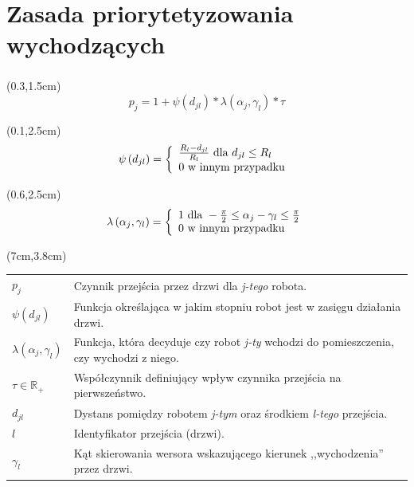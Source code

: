 \documentclass{beamer}
\begin{document}
\section{Zasada priorytetyzowania wychodzących}
\begin{frame}
\frametitle{\secname}

\begin{textblock*}{5cm}(0.3\linewidth,1.5cm) %
	\begin{equation*}
	p_j = 1 + \psi\left(d_{jl}\right) * \lambda\left(\alpha_j,\gamma_l\right) * \tau 
	\end{equation*}
\end{textblock*}

\begin{textblock*}{5cm}(0.1\linewidth,2.5cm) %
	\footnotesize{
		\begin{equation*}
		\psi\left(d_{jl}\right) = \left\{\begin{array}{ll}
		\frac{R_{l} - d_{jl}}{R_{l}} \mbox{ dla } d_{jl} \le R_{l} \\
		0 \mbox{ w innym przypadku }        
		\cr
		\end{array}\right.
		\end{equation*}
	}
\end{textblock*}

\begin{textblock*}{5cm}(0.6\linewidth,2.5cm) %
	\footnotesize{
		\begin{equation*}
		\lambda\left(\alpha_j,\gamma_l\right) = \left\{\begin{array}{ll}
		1  \mbox{ dla } - \frac{\pi}{2} \leq \alpha_j - \gamma_l \leq \frac{\pi}{2} \\
		0  \mbox{ w innym przypadku }
		\cr
		\end{array}\right.
		\end{equation*}	
	}
\end{textblock*}

\begin{textblock*}{4.8cm}(7cm,3.8cm) %
	\scriptsize{
		\begin{tabular}{lp{}}
			$ p_j $ 						& Czynnik przejścia przez drzwi dla  \textit{j-tego} robota.\\
			$ \psi\left(d_{jl}\right) $ 	& Funkcja określająca w jakim stopniu robot jest w zasięgu działania drzwi.\\
			$ \lambda(\alpha_j,\gamma_l) $ 	& Funkcja, która decyduje czy robot \textit{j-ty} wchodzi do pomieszczenia, czy wychodzi z niego.\\
			$ \tau \in \mathbb{R}_{+} $ 	& Współczynnik definiujący wpływ czynnika przejścia na pierwszeństwo.\\
			$ d_{jl} $ 						& Dystans pomiędzy robotem \textit{j-tym} oraz środkiem \textit{l-tego} przejścia.\\
			$ l $ 							& Identyfikator przejścia (drzwi). \\
			$ \gamma_l $ 					& Kąt skierowania wersora wskazującego kierunek ,,wychodzenia'' przez drzwi.
		\end{tabular}
	}
\end{textblock*}


\end{frame}
\end{document}
